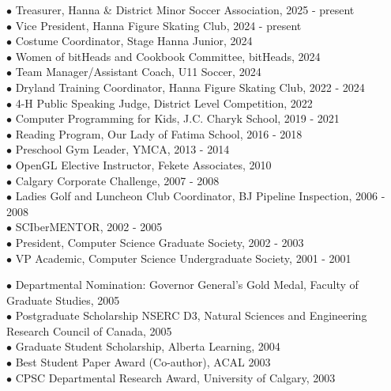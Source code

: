 \documentclass[9pt]{developercv} %
\begin{document}

$\bullet$ Treasurer, Hanna \& District Minor Soccer Association, 2025 - present
\\$\bullet$ Vice President, Hanna Figure Skating Club, 2024 - present
\\ $\bullet$ Costume Coordinator, Stage Hanna Junior, 2024
\\ $\bullet$ Women of bitHeads and Cookbook Committee, bitHeads, 2024 
\\ $\bullet$ Team Manager/Assistant Coach, U11 Soccer, 2024
\\ $\bullet$ Dryland Training Coordinator, Hanna Figure Skating Club, 2022 - 2024
\\ $\bullet$ 4-H Public Speaking Judge, District Level Competition, 2022
\\ $\bullet$ Computer Programming for Kids, J.C. Charyk School, 2019 - 2021
\\ $\bullet$ Reading Program, Our Lady of Fatima School, 2016 - 2018
\\ $\bullet$ Preschool Gym Leader, YMCA,  2013 - 2014
\\ $\bullet$ OpenGL Elective Instructor, Fekete Associates, 2010
\\ $\bullet$ Calgary Corporate Challenge, 2007 - 2008
\\ $\bullet$ Ladies Golf and Luncheon Club Coordinator, BJ Pipeline Inspection, 2006 - 2008 
\\ $\bullet$ SCIberMENTOR, 2002 - 2005
\\ $\bullet$ President, Computer Science Graduate Society, 2002 - 2003
\\ $\bullet$ VP Academic, Computer Science Undergraduate Society, 2001 - 2001


$\bullet$ Departmental Nomination: Governor General's Gold Medal, Faculty of Graduate Studies, 2005
\\ $\bullet$ Postgraduate Scholarship NSERC D3, Natural Sciences and Engineering Research Council of Canada, 2005
\\ $\bullet$ Graduate Student Scholarship, Alberta Learning, 2004
\\ $\bullet$ Best Student Paper Award (Co-author), ACAL 2003
\\ $\bullet$ CPSC Departmental Research Award, University of Calgary, 2003
\end{document}
